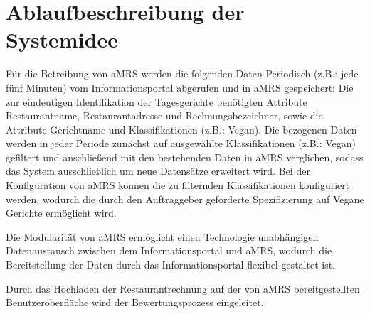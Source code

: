 \section{Ablaufbeschreibung der Systemidee}
Für die Betreibung von \ac{aMRS} werden die folgenden Daten Periodisch (z.B.: jede fünf Minuten) vom Informationsportal abgerufen und in \ac{aMRS} gespeichert:
Die zur eindeutigen Identifikation der Tagesgerichte benötigten Attribute Restaurantname, Restaurantadresse und Rechnungsbezeichner, sowie die Attribute Gerichtname und Klassifikationen (z.B.: Vegan).
Die bezogenen Daten werden in jeder Periode zunächst auf ausgewählte Klassifikationen (z.B.: Vegan) gefiltert und anschließend mit den bestehenden Daten in \ac{aMRS} verglichen, sodass das System ausschließlich um neue Datensätze erweitert wird.
Bei der Konfiguration von \ac{aMRS} können die zu filternden Klassifikationen konfiguriert werden, wodurch die durch den Auftraggeber geforderte Spezifizierung auf Vegane Gerichte ermöglicht wird.

Die Modularität von \ac{aMRS} ermöglicht einen Technologie unabhängigen Datenaustausch zwischen dem Informationsportal und \ac{aMRS}, wodurch die Bereitstellung der Daten durch das Informationsportal flexibel gestaltet ist.

Durch das Hochladen der Restaurantrechnung auf der von \ac{aMRS} bereitgestellten Benutzeroberfläche wird der Bewertungsprozess eingeleitet.
